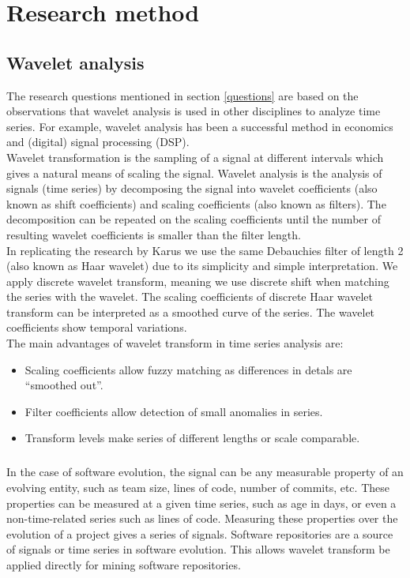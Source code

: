 \chapter{Research method}
\label{method}

\section{Wavelet analysis}
The research questions mentioned in section \ref{questions} are based on the
observations that wavelet analysis is used in other disciplines to analyze time
series. For example, wavelet analysis has been a successful method in economics
and (digital) signal processing (DSP).\\

Wavelet transformation is the sampling of a signal at different intervals which
gives a natural means of scaling the signal. Wavelet analysis is the analysis of
signals (time series) by decomposing the signal into wavelet coefficients (also
known as shift coefficients) and scaling coefficients (also known as filters).
The decomposition can be repeated on the scaling coefficients until the number
of resulting wavelet coefficients is smaller than the filter length.\\

In replicating the research by Karus we use the same Debauchies filter of length
2 (also known as Haar wavelet) due to its simplicity and simple interpretation.
We apply discrete wavelet transform, meaning we use discrete shift when matching
the series with the wavelet. The scaling coefficients of discrete Haar wavelet
transform can be interpreted as a smoothed curve of the series. The wavelet
coefficients show temporal variations.\\

\noindent
The main advantages of wavelet transform in time series analysis are:
\begin{itemize}
	\item Scaling coefficients allow fuzzy matching as differences in detals are
	``smoothed out''.
	\item Filter coefficients allow detection of small anomalies in series.
	\item Transform levels make series of different lengths or scale comparable.
\end{itemize}

\paragraph{}
In the case of software evolution, the signal can be any measurable property
of an evolving entity, such as team size, lines of code, number of commits, etc.
These properties can be measured at a given time series, such as age in days,
or even a non-time-related series such as lines of code. Measuring these
properties over the evolution of a project gives a series of signals. Software
repositories are a source of signals or time series in software evolution. This
allows wavelet transform be applied directly for mining software repositories.

